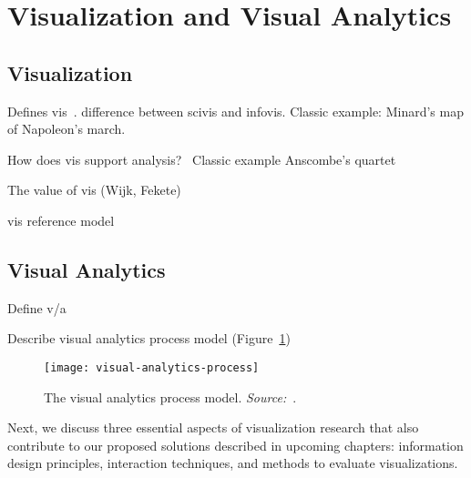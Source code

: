 \section{Visualization and Visual Analytics}

\subsection{Visualization}
Defines vis~\cite{Munzner2014}. difference between scivis and infovis. Classic example: Minard's map of Napoleon's march.

How does vis support analysis?~\cite{Card1999} Classic example Anscombe's quartet

The value of vis (Wijk, Fekete)

vis reference model~\cite{Card1999}


\subsection{Visual Analytics}
Define v/a~\cite{Thomas2005, Keim2010}

Describe visual analytics process model (Figure~\ref{fig:visual-analytics-process})

\begin{figure}[!htb]
	\centering
	\texttt{[image: visual-analytics-process]}
	\caption{The visual analytics process model. \emph{Source:~\cite{Keim2010}}.}
	\label{fig:visual-analytics-process}
\end{figure}


Next, we discuss three essential aspects of visualization research that also contribute to our proposed solutions described in upcoming chapters: information design principles, interaction techniques, and methods to evaluate visualizations.

